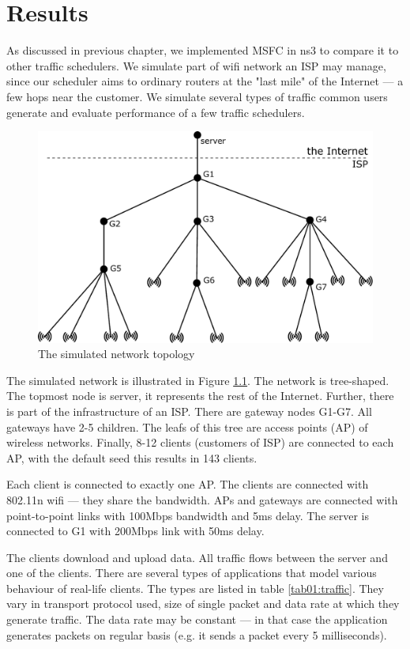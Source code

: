 \chapter{Results}
\label{chap:sidh}
As discussed in previous chapter, we implemented MSFC in ns3 to compare it to other traffic schedulers. We simulate part of wifi network an ISP may manage, since our scheduler aims to ordinary routers at the "last mile" of the Internet --- a few hops near the customer. We simulate several types of traffic common users generate and evaluate performance of a few traffic schedulers.

\begin{figure}
	\centering
	\includegraphics[width=137mm]{drawings/layout}
	\caption{The simulated network topology}
	\label{fig11:sim_layout}
\end{figure}


The simulated network is illustrated in Figure \ref{fig11:sim_layout}. The network is tree-shaped. The topmost node is server, it represents the rest of the Internet. Further, there is part of the infrastructure of an ISP. There are gateway nodes G1-G7. All gateways have 2-5 children. The leafs of this tree are access points (AP) of wireless networks. Finally, 8-12 clients (customers of ISP) are connected to each AP, with the default seed this results in 143 clients. 

Each client is connected to exactly one AP. The clients are connected with 802.11n wifi --- they share the bandwidth. APs and gateways are connected with point-to-point links with 100Mbps bandwidth and 5ms delay. The server is connected to G1 with 200Mbps link with 50ms delay.


The clients download and upload data. All traffic flows between the server and one of the clients. There are several types of applications that model various behaviour of real-life clients. The types are listed in table \ref{tab01:traffic}. They vary in transport protocol used, size of single packet and data rate at which they generate traffic. The data rate may be constant --- in that case the application generates packets on regular basis (e.g. it sends a packet every 5 milliseconds).

